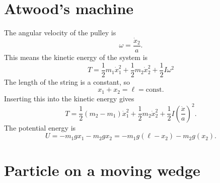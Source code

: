 \documentclass{article}
\begin{document}
    \section{Atwood's machine}
        The angular velocity of the pulley is 
        \begin{equation*}
            \omega = \frac{\dot x_2}{a}.
        \end{equation*}
        This means the kinetic energy of the system is 
        \begin{equation*}
            T = \frac{1}{2}m_1\dot x_1^2+\frac{1}{2}m_2\dot x_2^2 + \frac{1}{2}I \omega^2
        \end{equation*}
        The length of the string is a constant, so 
        \begin{equation*}
            x_1 + x_2 = \ell = \mathrm{const.}
        \end{equation*}
        Inserting this into the kinetic energy gives 
        \begin{equation*}
            T = \frac{1}{2}(m_2-m_1)\dot x_1^2+\frac{1}{2}m_2\dot x_2^2 + \frac{1}{2}I \left(\frac{\dot x}{a}\right)^2.
        \end{equation*}
        The potential energy is
        \begin{equation*}
            U = - m_1 g x_1 - m_2 g x_2 = -m_1g(\ell -x_2) - m_2g(x_2).
        \end{equation*}

    \section{Particle on a moving wedge}
\end{document}
